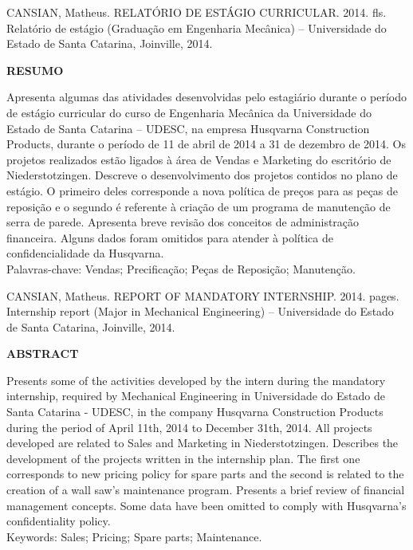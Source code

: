 \documentclass[12pt]{article}
\begin{document}
{
	\begin{flushleft}
	{
		\noindent
		CANSIAN, Matheus. RELATÓRIO DE ESTÁGIO CURRICULAR. 2014. \pageref{LastPage} fls. Relatório de estágio (Graduação em Engenharia Mecânica) – Universidade do Estado de Santa Catarina, Joinville, 2014. 
	}\\[2cm]
	\end{flushleft}
	
	\begin{center}
	{
		\bf RESUMO
	}\\[3cm]
	\end{center}
	
	{
		\noindent
		Apresenta algumas das atividades desenvolvidas pelo estagiário durante o período de estágio curricular do curso de Engenharia Mecânica da Universidade do Estado de Santa Catarina – UDESC, na empresa Husqvarna Construction Products, durante o período de 11 de abril de 2014 a 31 de dezembro de 2014. Os projetos realizados estão ligados à área de Vendas e Marketing do escritório de Niederstotzingen. Descreve o desenvolvimento dos projetos contidos no plano de estágio. O primeiro deles corresponde a nova política de preços para as peças de reposição e o segundo é referente à criação de um programa de manutenção de serra de parede. Apresenta breve revisão dos conceitos de administração financeira. Alguns dados foram omitidos para atender à política de confidencialidade da Husqvarna.
	}\\[1cm]

	{
		\noindent
		Palavras-chave: Vendas; Precificação; Peças de Reposição; Manutenção.
	}
}
\pagebreak

{
	\noindent
	
	\begin{flushleft}
	{
		\noindent
		CANSIAN, Matheus. REPORT OF MANDATORY INTERNSHIP. 2014. \pageref{LastPage} pages. Internship report (Major in Mechanical Engineering) – Universidade do Estado de Santa Catarina, Joinville, 2014. 
	}\\[2cm]
	\end{flushleft}
	
	\begin{center}
	{
		\bf ABSTRACT
	}\\[3cm]
	\end{center}
	
	{
		\noindent
		Presents some of the activities developed by the intern during the mandatory internship, required by Mechanical Engineering in Universidade do Estado de Santa Catarina - UDESC, in the company Husqvarna Construction Products during the period of April 11th, 2014 to December 31th, 2014. All projects developed are related to Sales and Marketing in Niederstotzingen. Describes the development of the projects written in the internship plan. The first one corresponds to new pricing policy for spare parts and the second is related to the creation of a wall saw's maintenance program. Presents a brief review of financial management concepts. Some data have been omitted to comply with Husqvarna's confidentiality policy.
	}\\[1cm]
	

	{
		\noindent
		Keywords: Sales; Pricing; Spare parts; Maintenance.
	}
}
\pagebreak
\end{document}
